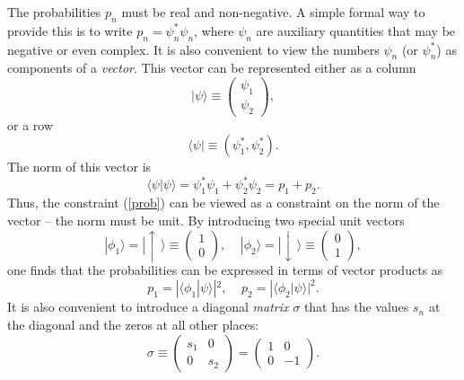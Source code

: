 \documentclass[12pt]{article}
\begin{document}
The probabilities $p_n$ must be real and non-negative.
A simple formal way to provide this is to write
$p_n=\psi_n^*\psi_n$, where $\psi_n$ are 
auxiliary quantities that may be negative or even complex.      
It is also convenient to view the numbers $\psi_n$ (or $\psi_n^*$)  
as components of a {\em vector}. This vector can be represented either 
as a column
\begin{equation}\label{col}
|\psi\rangle \equiv \left( \begin{array}{c}
\psi_1 \\ \psi_2 \end{array} \right) ,
\end{equation}
or a row
\begin{equation}\label{row}
\langle \psi| \equiv (\psi_1^* , \psi_2^*) .
\end{equation}
The norm of this vector is
\begin{equation}\label{norm}
\langle \psi|\psi \rangle=\psi_1^*\psi_1+\psi_2^*\psi_2=p_1 + p_2 .
\end{equation}
Thus, the constraint (\ref{prob}) can be viewed as a constraint 
on the norm of the vector -- the norm must be unit.
By introducing two special unit vectors
\begin{equation}\label{basis}
|\phi_1\rangle = |\!\uparrow\,\rangle \equiv 
\left( \begin{array}{c}
1 \\ 0 \end{array} \right) , \;\;\;\;
|\phi_2\rangle = |\!\downarrow\,\rangle \equiv \left( \begin{array}{c}
0 \\ 1 \end{array} \right) ,
\end{equation}  
one finds that the probabilities can be expressed in terms of 
vector products as
\begin{equation}\label{p12}
p_1=|\langle \phi_1|\psi\rangle|^2 , \;\;\;\;
p_2=|\langle \phi_2|\psi\rangle|^2 .
\end{equation}
It is also convenient to introduce a diagonal {\em matrix} $\sigma$ that 
has the values $s_n$ at the diagonal and the zeros at all other places:
\begin{equation}\label{sigma}
\sigma\equiv \left( \begin{array}{cc}
s_1 & 0 \\
0 & s_2 
\end{array} \right)
= \left( \begin{array}{cc}
1 & 0 \\
0 & -1
\end{array} \right) .
\end{equation}   
\end{document}
